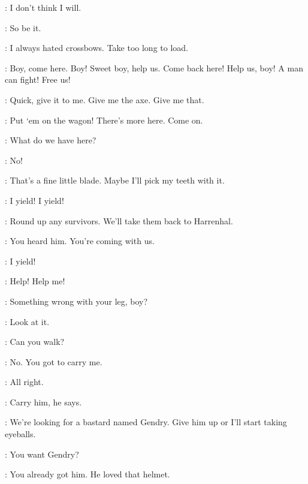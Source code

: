 \YOREN: I don't think I will. 

\AMORY: So be it. 


\YOREN: I always hated crossbows. Take too long to load. 


\JAQEN: Boy, come here. Boy! Sweet boy, help us. Come back here! Help us, boy! A man can fight! Free us! 


\JAQEN: Quick, give it to me. Give me the axe. Give me that. 




\POLLIVER: Put `em on the wagon! There's more here. Come on. 


\POLLIVER: What do we have here? 

\ARYA: No! 


\POLLIVER: That's a fine little blade. Maybe I'll pick my teeth with it. 

\HOTPIE: I yield! I yield! 

\AMORY: Round up any survivors. We'll take them back to Harrenhal. 

\POLLIVER: You heard him. You're coming with us. 

\HOTPIE: I yield! 

\LOMMY:  Help! Help me! 

\POLLIVER: Something wrong with your leg, boy? 

\LOMMY: Look at it. 

\POLLIVER: Can you walk? 

\LOMMY: No. You got to carry me. 

\POLLIVER: All right. 


\POLLIVER: Carry him, he says. 


\AMORY: We're looking for a bastard named Gendry. Give him up or I'll start taking eyeballs. 

\ARYA: You want Gendry?


\ARYA: You already got him. He loved that helmet. 


